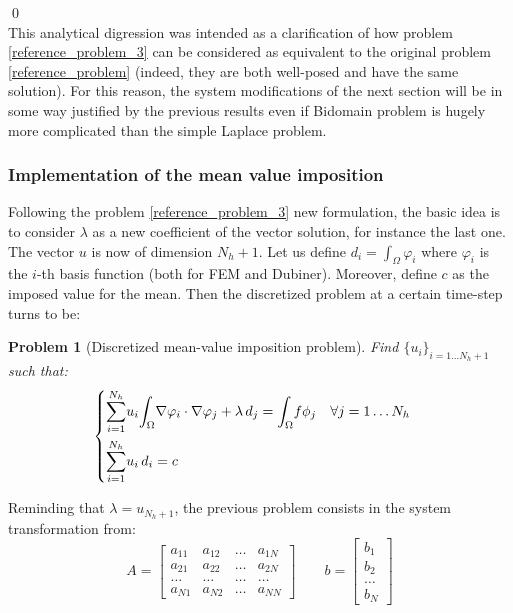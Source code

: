 \documentclass[a4paper,11pt]{article}
\newtheorem{problem}{Problem}
\begin{document}
	\qed
	\vspace{3mm} \\
	\noindent This analytical digression was intended as a clarification of how problem \ref{reference_problem_3} can be considered as equivalent to the original problem \ref{reference_problem} (indeed, they are both well-posed and have the same solution). For this reason, the system modifications of the next section will be in some way justified by the previous results even if Bidomain problem is hugely more complicated than the simple Laplace problem.

\vspace{8mm}

\subsubsection{Implementation of the mean value imposition} \label{mean_value_implementation}
\noindent Following the problem \ref{reference_problem_3} new formulation, the basic idea is to consider $\lambda$ as a new coefficient of the vector solution, for instance the last one. The vector $u$ is now of dimension $N_h+1$. Let us define $d_i=\int_\Omega \varphi_i$ where $\varphi_i$ is the $i$-th basis function (both for FEM and Dubiner). Moreover, define $c$ as the imposed value for the mean. Then the discretized problem at a certain time-step turns to be:

\begin{problem}[Discretized mean-value imposition problem]
	Find $\{u_i\}_{i=1\dots N_h+1}$ such that:
	\begin{equation*}
	\begin{cases}
	\mathlarger{\sum}_{i=1}^{N_h} u_i \mathlarger{\int}_{\Omega}\nabla\varphi_i \cdot \nabla \varphi_j + \lambda \,d_j=\mathlarger{\int}_{\Omega}f\phi_j \quad \forall j=1\dots N_h \\[3ex]
	\mathlarger{\sum}_{i=1}^{N_h} u_i \,d_i = c
	\end{cases}
	\end{equation*}
\end{problem}
\vspace{3mm}
\noindent Reminding that $\lambda=u_{N_h+1}$, the previous problem consists in the system transformation from: \\
\begin{equation*}
A=\begin{bmatrix}
a_{11} & a_{12} & \dots & a_{1N} \\ 
a_{21} & a_{22} & \dots & a_{2N} \\ 
\dots & \dots & \dots & \dots \\
a_{N1}  & a_{N2} & \dots & a_{NN}
\end{bmatrix} \quad \quad
b=\begin{bmatrix}
b_1 \\ b_2 \\ \dots \\ b_N
\end{bmatrix}
\end{equation*}
\end{document}
